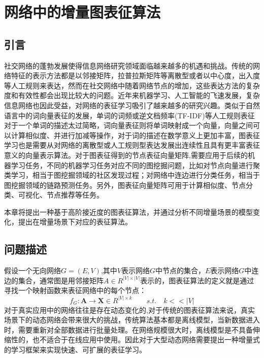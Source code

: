 \chapter{网络中的增量图表征算法}
\section{引言}
	社交网络的蓬勃发展使得信息网络研究领域面临越来越多的机遇和挑战。传统的网络特征的表示方法都是以邻接矩阵，拉普拉斯矩阵等离散型或者以中心度，出入度等人工规则来表达，然而在社交网络中随着网络节点的增加，这些表达方法的复杂度和有效性都会出现比较大的问题。近年来机器学习、人工智能的飞速发展，复杂信息网络也因此受益，对网络的表征学习吸引了越来越多的研究兴趣。类似于自然语言中的词向量表征的发展，单词的词频或逆文档频率(TF-IDF)等人工规则表征对于一个单词的描述太过简略，词向量表征则将单词映射成一个向量，向量之间可以计算相似度、并进行加减等操作，对于词的描述在数学意义上更加丰富，图表征学习也是需要从对网络的离散型或人工规则型表达发展出连续性且具有更丰富表征意义的向量表示算法。对于图表征得到的节点表征向量矩阵,需要应用于后续的机器学习任务，不同的机器学习任务对应不同的图挖掘问题，比如对节点向量进行聚类学习，相当于图挖掘领域的社区发现过程；对网络中连边进行分类任务，相当于图挖掘领域的链路预测任务。另外，图表征向量矩阵可用于计算相似度、节点分类、可视化、节点推荐等任务。
	
	本章将提出一种基于高阶接近度的图表征算法，并通过分析不同增量场景的模型变化，提出在增量场景下对应的表征算法。
	
\section{问题描述}
假设一个无向网络$G=(E,V)$,其中$V$表示网络$G$中节点的集合，$E$表示网络$G$中连边的集合，通常图是用邻接矩阵$A \in R^{|V|\times|V|}$表示的，图表征算法的定义就是通过寻找一个映射函数来表征网络中的每个节点：
\begin{equation}
f_G: \textbf{A} \rightarrow \textbf{X} \in R^{|V| \times k} \qquad s.t.\quad k<<|V|
\end{equation}
对于真实应用中的网络往往是存在动态变化的,对于传统的图表征算法来说，真实场景下的动态网络会带来很大的挑战，传统算法基本都是离线模型，当新数据进入时，需要重新对全部数据进行批量处理。在网络规模很大时，离线模型是不具备伸缩性的，也不适合于在线应用中使用。因此对于大型动态网络需要提出一种增量式的学习框架来实现快速、可扩展的表征学习。

